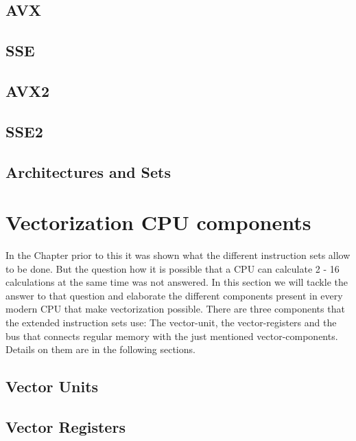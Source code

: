 \documentclass[
	12pt,
	a4paper,
	BCOR10mm,
	DIV14,
	headsepline,
	usegeometry,
]{scrreprt}
\begin{document}
    \section{AVX}
    \section{SSE}
    \section{AVX2}
    \section{SSE2}
    \section{Architectures and Sets}
\chapter{Vectorization CPU components}
In the Chapter prior to this it was shown what the different instruction sets allow to be done. But
the question how it is possible that a CPU can calculate 2 - 16 calculations at the same time was
not answered. In this section we will tackle the answer to that question and elaborate the
different components present in every modern CPU that make vectorization possible.
There are three components that the extended instruction sets use: The vector-unit, the
vector-registers and the bus that connects regular memory with the just mentioned
vector-components. Details on them are in the following sections.
\section{Vector Units}

\section{Vector Registers}
\end{document}
